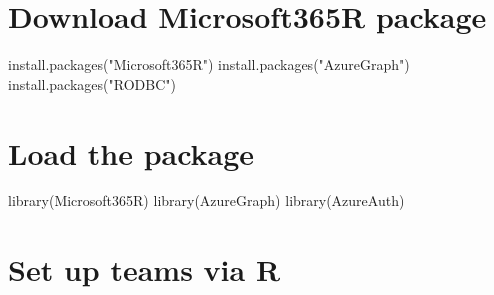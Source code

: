 \documentclass[
]{book}
\newenvironment{Shaded}{\begin{snugshade}}{\end{snugshade}}
\newcommand{\FunctionTok}[1]{\textcolor[rgb]{0.00,0.00,0.00}{#1}}
\newcommand{\NormalTok}[1]{#1}
\newcommand{\StringTok}[1]{\textcolor[rgb]{0.31,0.60,0.02}{#1}}
\begin{document}
\hypertarget{download-microsoft365r-package}{%
\section{Download Microsoft365R package}\label{download-microsoft365r-package}}

\begin{Shaded}
\begin{Highlighting}[]
\FunctionTok{install.packages}\NormalTok{(}\StringTok{"Microsoft365R"}\NormalTok{)}
\FunctionTok{install.packages}\NormalTok{(}\StringTok{"AzureGraph"}\NormalTok{)}
\FunctionTok{install.packages}\NormalTok{(}\StringTok{"RODBC"}\NormalTok{)}
\end{Highlighting}
\end{Shaded}

\hypertarget{load-the-package}{%
\section{Load the package}\label{load-the-package}}

\begin{Shaded}
\begin{Highlighting}[]
\FunctionTok{library}\NormalTok{(Microsoft365R)}
\FunctionTok{library}\NormalTok{(AzureGraph)}
\FunctionTok{library}\NormalTok{(AzureAuth)}
\end{Highlighting}
\end{Shaded}

\hypertarget{set-up-teams-via-r}{%
\section{Set up teams via R}\label{set-up-teams-via-r}}
\end{document}
